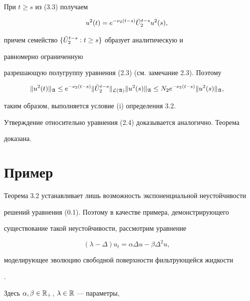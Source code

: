 \begin{pf}
При $t\ge s$ из (3.3) получаем 


$$ 


u^2(t)=e^{-\nu_2(t-s)}\Tilde U_2^{t-s}u^2(s), 


$$ 


причем семейство $\{\Tilde U_2^{t-s}:t\ge s\}$ образует аналитическую и 


равномерно ограниченную 


разрешающую полугруппу уравнения (2.3) (см. замечание 2.3). Поэтому 


$$ 


\|u^2(t)\|_{\frak A}\le e^{-\nu_2(t-s)} 


\|\Tilde U_2^{t-s}\|_{\cal L(\frak A)}\|u^2(s)\|_{\frak A}\le 


N_2e^{-\nu_2(t-s)}\|u^2(s)\|_{\frak A}, 


$$ 


таким образом, выполняется условие (i) определения 3.2. 


 


Утверждение относительно уравнения (2.4) доказывается аналогично. Теорема 


доказана. 


\end{pf} 


 


\section{Пример} 


 


Теорема 3.2 устанавливает лишь возможность экспоненциальной неустойчивости 


решений уравнения (0.1). Поэтому в качестве примера, демонстрирующего 


существование такой неустойчивости, рассмотрим уравнение 


\begin{equation} 


(\lambda-\Delta)u_t=\alpha\Delta u-\beta\Delta^2u, 


\end{equation} 


моделирующее эволюцию свободной поверхности фильтрующейся жидкости 


\cite{Sv6}. 


Здесь $\alpha,\beta\in\Bbb R_+$, $\lambda\in\Bbb R$ --- параметры, 


